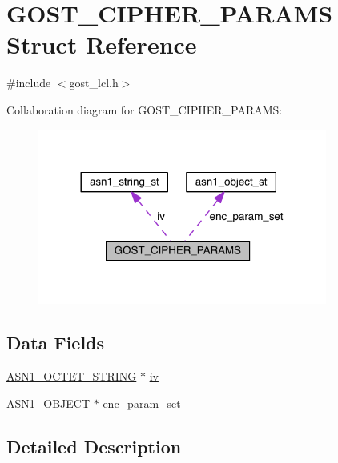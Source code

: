 \hypertarget{struct_g_o_s_t___c_i_p_h_e_r___p_a_r_a_m_s}{}\section{G\+O\+S\+T\+\_\+\+C\+I\+P\+H\+E\+R\+\_\+\+P\+A\+R\+A\+MS Struct Reference}
\label{struct_g_o_s_t___c_i_p_h_e_r___p_a_r_a_m_s}


{\ttfamily \#include $<$gost\+\_\+lcl.\+h$>$}



Collaboration diagram for G\+O\+S\+T\+\_\+\+C\+I\+P\+H\+E\+R\+\_\+\+P\+A\+R\+A\+MS\+:\nopagebreak
\begin{figure}[H]
\begin{center}
\leavevmode
\includegraphics[width=269pt]{struct_g_o_s_t___c_i_p_h_e_r___p_a_r_a_m_s__coll__graph}
\end{center}
\end{figure}
\subsection*{Data Fields}
\begin{DoxyCompactItemize}
\item 
\hyperlink{crypto_2ossl__typ_8h_afbd05e94e0f0430a2b729473efec88c1}{A\+S\+N1\+\_\+\+O\+C\+T\+E\+T\+\_\+\+S\+T\+R\+I\+NG} $\ast$ \hyperlink{struct_g_o_s_t___c_i_p_h_e_r___p_a_r_a_m_s_a57a1987e7810a9dfef35da340b072e02}{iv}
\item 
\hyperlink{crypto_2ossl__typ_8h_ae3fda0801e4c8e250087052bafb3ce2e}{A\+S\+N1\+\_\+\+O\+B\+J\+E\+CT} $\ast$ \hyperlink{struct_g_o_s_t___c_i_p_h_e_r___p_a_r_a_m_s_a0c22c4e82f76702cee581c262677057f}{enc\+\_\+param\+\_\+set}
\end{DoxyCompactItemize}


\subsection{Detailed Description}


